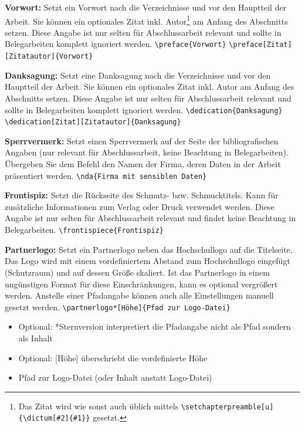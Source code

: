 	\textbf{Vorwort:}\label{cmd:preface}
	Setzt ein Vorwort nach die Verzeichnisse und vor den Hauptteil der Arbeit.
	Sie können ein optionales Zitat inkl. Autor\footnote{\label{ftn:chapterquote}Das Zitat wird wie sonst auch üblich mittels \texttt{\textbackslash{}setchapterpreamble[u]\{\textbackslash{}dictum[\#2]\{\#1\}\}} gesetzt.} am Anfang des Abschnitts setzen.
	Diese Angabe ist nur selten für Abschlussarbeit relevant und sollte in Belegarbeiten komplett ignoriert werden.
	\newline
	\verb|\preface{Vorwort}|
	\newline
	\verb|\preface[Zitat][Zitatautor]{Vorwort}|
	
	\textbf{Danksagung:}\label{cmd:dedication}
	Setzt eine Danksagung nach die Verzeichnisse und vor den Hauptteil der Arbeit.
	Sie können ein optionales Zitat inkl. Autor am Anfang des Abschnitts setzen.
	Diese Angabe ist nur selten für Abschlussarbeit relevant und sollte in Belegarbeiten komplett ignoriert werden.
	\newline
	\verb|\dedication{Danksagung}|
	\newline
	\verb|\dedication[Zitat][Zitatautor]{Danksagung}|
	
	\textbf{Sperrvermerk:}\label{cmd:nda}
	Setzt einen Sperrvermerk auf der Seite der bibliografischen Angaben (nur relevant für Abschlussarbeit, keine Beachtung in Belegarbeiten).
	Übergeben Sie dem Befehl den Namen der Firma, deren Daten in der Arbeit präsentiert werden.
	\newline
	\verb|\nda{Firma mit sensiblen Daten}|
	
	\textbf{Frontispiz:}\label{cmd:frontispiece}
	Setzt die Rückseite des Schmutz- bzw. Schmucktitels.
	Kann für zusätzliche Informationen zum Verlag oder Druck verwendet werden.
	Diese Angabe ist nur selten für Abschlussarbeit relevant und findet keine Beachtung in Belegarbeiten.
	\newline
	\verb|\frontispiece{Frontispiz}|
	
	\textbf{Partnerlogo:}\label{cmd:partnerlogo}
	Setzt ein Partnerlogo neben das Hochschullogo auf die Titelseite.
	Das Logo wird mit einem vordefiniertem Abstand zum Hochschullogo eingefügt (Schutzraum) und auf dessen Größe skaliert.
	Ist das Partnerlogo in einem ungünstigen Format für diese Einschränkungen, kann es optional vergrößert werden.
	Anstelle einer Pfadangabe können auch alle Einstellungen manuell gesetzt werden.
	\newline
	\verb|\partnerlogo*[Höhe]{Pfad zur Logo-Datei}|
	\begin{itemize}
		\item Optional: *Sternversion interpretiert die Pfadangabe nicht als Pfad sondern als Inhalt
		\item Optional: [Höhe] überschriebt die vordefinierte Höhe
		\item Pfad zur Logo-Datei (oder Inhalt anstatt Logo-Datei)
	\end{itemize}
	

